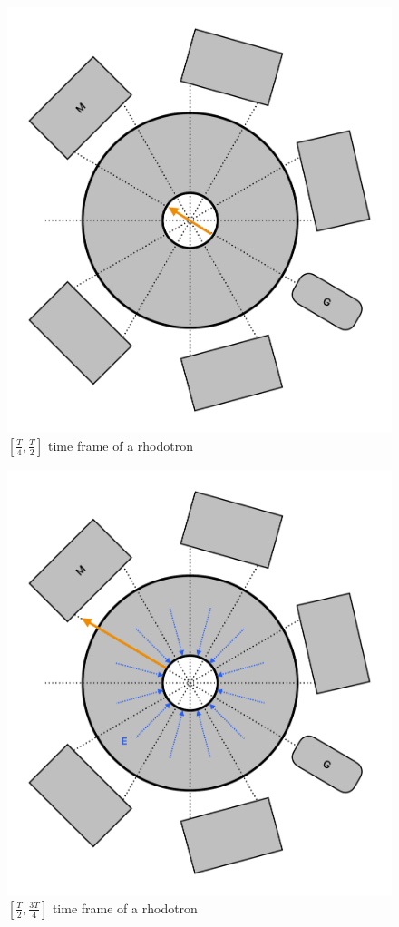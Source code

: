 \documentclass[a4paper,oneside,12pt]{report}
\numberwithin{equation}{chapter}
\begin{document}
\begin{figure}[H]
    \centering
    \includegraphics[width=\textwidth]{./figures/illustrations/rhod2.pdf}
    \caption{$[\frac{T}{4}, \frac{T}{2}]$ time frame of a rhodotron}
    \label{fig:rhod_cycle_2}
\end{figure}
\begin{figure}[H]
    \centering
    \includegraphics[width=\textwidth]{./figures/illustrations/rhod3.pdf}
    \caption{$[\frac{T}{2}, \frac{3T}{4}]$ time frame of a rhodotron}
    \label{fig:rhod_cycle_3}
\end{figure}
\end{document}
